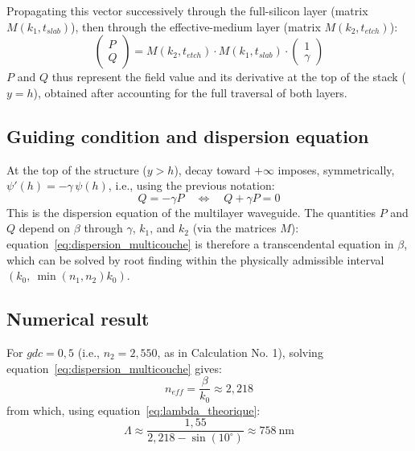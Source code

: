 \documentclass[a4paper,11pt]{report}
\begin{document}
Propagating this vector successively through the full-silicon layer (matrix $M(k_1,t_{slab})$), then through the effective-medium layer (matrix $M(k_2,t_{etch})$):
\begin{equation}
\begin{pmatrix}P\\Q\end{pmatrix} = M(k_2,t_{etch})\cdot M(k_1,t_{slab})\cdot\begin{pmatrix}1\\\gamma\end{pmatrix}
\label{eq:propagation}
\end{equation}
$P$ and $Q$ thus represent the field value and its derivative at the top of the stack ($y=h$), obtained after accounting for the full traversal of both layers.

\subsection*{Guiding condition and dispersion equation}

At the top of the structure ($y>h$), decay toward $+\infty$ imposes, symmetrically, $\psi'(h)=-\gamma\,\psi(h)$, i.e., using the previous notation:
\begin{equation}
Q = -\gamma P \quad\Longleftrightarrow\quad Q+\gamma P = 0
\label{eq:dispersion_multicouche}
\end{equation}
This is the dispersion equation of the multilayer waveguide. The quantities $P$ and $Q$ depend on $\beta$ through $\gamma$, $k_1$, and $k_2$ (via the matrices $M$): equation~\eqref{eq:dispersion_multicouche} is therefore a transcendental equation in $\beta$, which can be solved by root finding within the physically admissible interval $\left(k_0,\ \min(n_1,n_2)k_0\right)$.

\subsection*{Numerical result}

For $gdc=0{,}5$ (i.e., $n_2=2{,}550$, as in Calculation No. 1), solving equation~\eqref{eq:dispersion_multicouche} gives:
\begin{equation}
n_{eff} = \frac{\beta}{k_0} \approx 2{,}218
\end{equation}
from which, using equation~\eqref{eq:lambda_theorique}:
\begin{equation}
\Lambda \approx \frac{1{,}55}{2{,}218-\sin(10^\circ)} \approx 758~\text{nm}
\end{equation}
\end{document}
